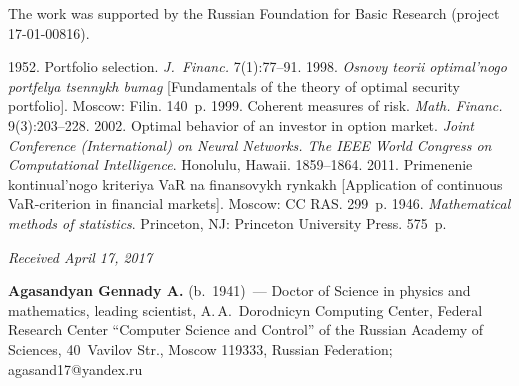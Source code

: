   

\vspace*{-14pt}

\Ack
\noindent
The work was supported by the
Russian Foundation for Basic Research (project 17-01-00816).




  \begin{multicols}{2}

\renewcommand{\bibname}{\protect\rmfamily References}

{\small\frenchspacing
 {%
 \begin{thebibliography}{9} 
   1952. Portfolio selection. \textit{J.~Financ.} 7(1):77--91.
   1998. \textit{Osnovy teorii optimal'nogo portfelya tsennykh bumag} 
[Fundamentals of the theory of optimal security portfolio]. Moscow: Filin. 140~p.
   1999. Coherent measures of risk. 
\textit{Math. Financ.} 9(3):203--228.
   2002. Optimal behavior of an investor in option market. \textit{Joint 
Conference (International) on Neural Networks. The IEEE World Congress on Computational 
Intelligence}. Honolulu, Hawaii. 1859--1864. 
   2011. Primenenie kontinual'nogo kriteriya VaR na finansovykh 
rynkakh [Application of continuous VaR-criterion in financial markets]. Moscow: CC RAS. 
299~p. 
   1946. \textit{Mathematical methods of statistics}. Princeton, NJ: Princeton 
University Press. 575~p.

\end{thebibliography}

 }
 }

\end{multicols}

\vspace*{-9pt}

\hfill{\small\textit{Received April 17, 2017}}

\vspace*{-24pt}
  
  \Contrl
  
   \noindent
   \textbf{Agasandyan Gennady A.} (b.\ 1941)~--- Doctor of Science in physics 
and mathematics, leading scientist, A.\,A.~Dorodnicyn Computing Center, Federal 
Research Center ``Computer Science and Control'' of the Russian Academy of 
Sciences, 40~Vavilov Str., Moscow 119333, Russian Federation; 
\mbox{agasand17@yandex.ru}

   
\label{end\stat}


\renewcommand{\bibname}{\protect\rm Литература} 
   